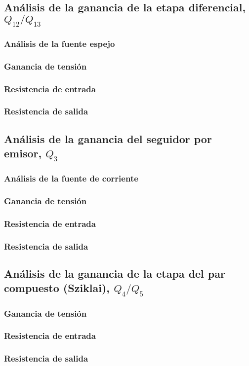 \subsection{Análisis de la ganancia de la etapa diferencial, $Q_{12}/Q_{13}$}

\subsubsection{Análisis de la fuente espejo}

\subsubsection{Ganancia de tensión}

\subsubsection{Resistencia de entrada}

\subsubsection{Resistencia de salida}


\subsection{Análisis de la ganancia del seguidor por emisor, $Q_{3}$}

\subsubsection{Análisis de la fuente de corriente}

\subsubsection{Ganancia de tensión}

\subsubsection{Resistencia de entrada}

\subsubsection{Resistencia de salida}


\subsection{Análisis de la ganancia de la etapa del par compuesto (Sziklai), $Q_{4}/Q_{5}$}

\subsubsection{Ganancia de tensión}

\subsubsection{Resistencia de entrada}

\subsubsection{Resistencia de salida}

